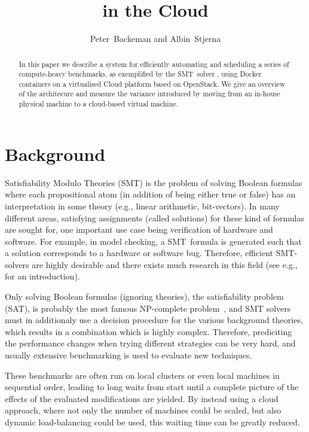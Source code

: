 \documentclass[a4paper]{IEEEtran}
\title{\uppsat{} in the Cloud}
\author{Peter~Backeman and Albin~Stjerna}
\begin{document}
\maketitle

\begin{abstract}
  In this paper we describe a system for efficiently automating and
  scheduling a series of compute-heavy benchmarks, as exemplified by
  the SMT~solver {\uppsat{}}, using Docker containers on a virtualised
  Cloud platform based on OpenStack. We give an overview of the
  architecure and measure the variance introduced by moving from an
  in-house physical machine to a cloud-based virtual machine.
\end{abstract}

\section{Background}

Satisfiability Modulo Theories (SMT) is the problem of solving Boolean
formulas where each propositional atom (in addition of being either
true or false) has an interpretation in some theory (e.g., linear
arithmetic, bit-vectors). In many different areas, satisfying
assignments (called solutions) for these kind of formulas are sought
for, one important use case being verification of hardware and
software. For example, in model checking, a SMT~formula is generated
such that a solution corresponds to a hardware or software
bug. Therefore, efficient SMT-solvers are highly desirable and there
exists much research in this field (see e.g.,~\cite{sathandbook} for
an introduction).

Only solving Boolean formulas (ignoring theories), the satisfiability
problem (SAT), is probably the most famous NP-complete
problem~\cite{satnp}, and SMT solvers must in additionaly use a
decision procedure for the various background theories, which results
in a combination which is highly complex. Therefore, prediciting the
performance changes when trying different strategies can be very hard,
and usually extensive benchmarking is used to evaluate new techniques.

These benchmarks are often run on local clusters or even local
machines in sequential order, leading to long waits from start until a
complete picture of the effects of the evaluated modifications are
yielded. By instead using a cloud approach, where not only the number
of machines could be scaled, but also dynamic load-balancing could be
used, this waiting time can be greatly reduced.
\end{document}
